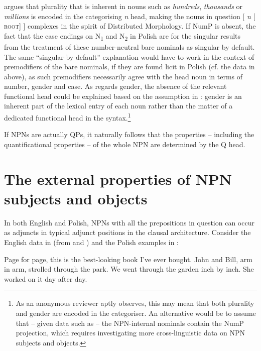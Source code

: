 \documentclass[output=paper]{langscibook}
\begin{document}
\noindent \citet{Acquaviva2008} argues that plurality that is inherent in nouns such as \textit{hundreds}, \textit{thousands} or \textit{millions} is encoded in the categorising \textit{n} head, making the nouns in question [ \textit{n} [ \textsc{root}] ] complexes in the spirit of Distributed Morphology. If NumP is absent, the fact that the case endings on N\textsubscript{1} and N\textsubscript{2} in Polish are for the singular results from the treatment of these number-neutral bare nominals as singular by default. The same ``singular-by-default'' explanation would have to work in the context of premodifiers of the bare nominals, if they are found licit in Polish (cf. the data in  above), as such premodifiers necessarily agree with the head noun in terms of number, gender and case. As regards gender, the absence of the relevant functional head could be explained based on the assumption in \citet{Alexiadou.etal2007}: gender is an inherent part of the lexical entry of each noun rather than the matter of a dedicated functional head in the syntax.\footnote{As an anonymous reviewer aptly observes, this may mean that both plurality and gender are encoded in the categoriser. An alternative would be to assume that – given data such as  – the NPN-internal nominals contain the NumP projection, which requires investigating more cross-linguistic data on NPN subjects and objects.}

If NPNs are actually QPs, it naturally follows that the properties – including the quantificational properties – of the whole NPN are determined by the Q head.

\section{The external properties of NPN subjects and objects}\label{psk:sec:sec3}

In both English and Polish, NPNs with all the prepositions in question can occur as adjuncts in typical adjunct positions in the clausal architecture. Consider the English data in  (from \citealt{Jackendoff2008} and \citealt{Huddleston.Pullum2002}) and the Polish examples in :

\ea \label{psk:ex:key:17}\ea Page for page, this is the best-looking book I’ve ever   bought.
\ex John and Bill, arm in arm, strolled through the park.
\ex We went through the garden inch by inch.
\ex She worked on it day after day.\z
\z
\end{document}
